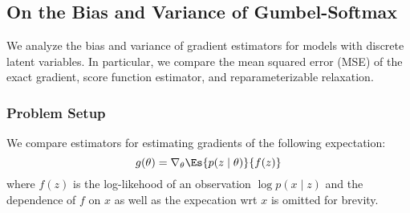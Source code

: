\subsection{On the Bias and Variance of Gumbel-Softmax}

We analyze the bias and variance of gradient estimators for models with
discrete latent variables.
In particular, we compare the mean squared error (MSE) of the exact gradient,
score function estimator, and reparameterizable relaxation.

\subsubsection{Problem Setup}
We compare estimators for estimating gradients of the following expectation:
\begin{equation}
g(\theta) = \nabla_\theta \Es{p(z \mid\theta)}{f(z)}
\end{equation}
where $f(z)$ is the log-likehood of an observation $\log p(x \mid z)$
and the dependence of $f$ on $x$ as well as the expecation wrt $x$ is omitted for brevity.

\subsubsection{}
